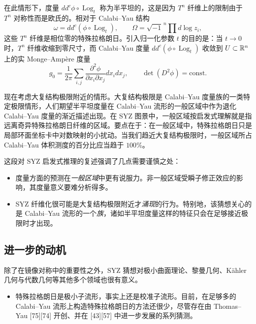 
在此情形下，度量 $dd^c\phi\circ\operatorname{Log}_t$ 称为半平坦的，这是因为 $T^n$ 纤维上的限制由于 $T^n$ 对称性而是欧氏的。相对于 Calabi--Yau 结构
\[
\omega = dd^c(\phi\circ\operatorname{Log}_t),\qquad \Omega=\sqrt{-1}^{\,n}\prod d\log z_i,
\]
这些 $T^n$ 纤维是相位零的特殊拉格朗日。引入归一化参数 $t$ 的目的是：当 $t\to0$ 时，$T^n$ 纤维收缩到零尺寸，而 Calabi--Yau 度量 $dd^c(\phi\circ\operatorname{Log}_t)$ 收敛到 $U\subset\mathbb{R}^n$ 上的实 Monge--Ampère 度量
\begin{equation}
g_0 = \frac{1}{2\pi}\sum_{i,j}\frac{\partial^2\phi}{\partial x_i\partial x_j}dx_idx_j,\qquad \det(D^2\phi)=\mathrm{const}. \tag{5.4}
\end{equation}


现在考虑大复结构极限附近的情形。大复结构极限是 Calabi--Yau 度量族的一类特定极限情形，人们期望半平坦度量在 Calabi--Yau 流形的一般区域中作为退化 Calabi--Yau 度量的渐近描述出现。在 SYZ 图景中，一般区域按启发式理解就是指远离奇异特殊拉格朗日纤维的区域。要点在于：在一般区域中，特殊拉格朗日只是局部环面坐标卡中对数映射的小扰动。当我们趋近大复结构极限时，一般区域所占 Calabi--Yau 体积测度的百分比应当趋于 $100\%$。


这段对 SYZ 启发式推理的复述强调了几点需要谨慎之处：

\begin{itemize}
\item 度量方面的预测在\emph{一般区域}中更有说服力。非一般区域受瞬子修正效应的影响，其度量意义要难分析得多。
\item SYZ 纤维化很可能是大复结构极限附近才\emph{涌现}的行为。特别地，该猜想关心的是 Calabi--Yau 流形的一个\emph{族}，诸如半平坦度量这样的特征只会在足够接近极限时才出现。
\end{itemize}

\subsection{进一步的动机}

除了在镜像对称中的重要性之外，SYZ 猜想对极小曲面理论、黎曼几何、Kähler 几何与代数几何等其他多个领域也很有意义。

\begin{itemize}
\item 特殊拉格朗日是极小子流形，事实上还是校准子流形。目前，在足够多的 Calabi--Yau 流形上构造特殊拉格朗日的方法还很少，尽管存在由 Thomas--Yau [75][74] 开创、并在 [43][57] 中进一步发展的系列猜测。
\end{itemize}
